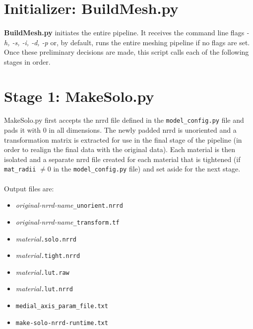 \documentclass[fleqn,12pt,openany]{book}
\begin{document}
\section{Initializer: BuildMesh.py}

\paragraph{}
{\bf BuildMesh.py} initiates the entire pipeline.  
It receives the command line flags \emph{-h, -s, -i, -d, -p} or, by default, 
runs the entire meshing pipeline if no flags are set.
Once these preliminary decisions are made, this script calls each of the following stages in order.

\section{Stage 1: MakeSolo.py}

\paragraph{}
MakeSolo.py first accepts the nrrd file defined in the \verb+model_config.py+ 
file and pads it with 0 in all dimensions.
The newly padded nrrd is unoriented and a transformation matrix is extracted for use in the final 
stage of the pipeline (in order to realign the final data with the original data).
Each material is then isolated and a separate nrrd file created for 
each material that is tightened (if \verb+mat_radii+ $\neq 0$ in the \verb+model_config.py+ 
file) and set aside for the next stage.   \\ \\
Output files are:

\begin{itemize}

\item{\emph{original-nrrd-name}\verb+_unorient.nrrd+}
\item{\emph{original-nrrd-name}\verb+_transform.tf+}
\item{\emph{material}\verb+.solo.nrrd+}
\item{\emph{material}\verb+.tight.nrrd+}
\item{\emph{material}\verb+.lut.raw+}
\item{\emph{material}\verb+.lut.nrrd+}
\item{\verb+medial_axis_param_file.txt+}
\item{\verb+make-solo-nrrd-runtime.txt+}

\end{itemize}
\end{document}
